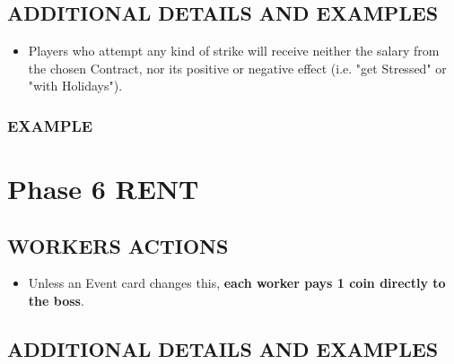     \subsection{ADDITIONAL DETAILS AND EXAMPLES}

        \begin{itemize}
            \item Players who attempt any kind of strike will receive neither the salary from
            the chosen Contract, nor its positive or negative effect (i.e. "get Stressed" or
            "with Holidays").
        \end{itemize}
    
        \subsubsection{EXAMPLE}




\section{Phase 6 RENT}

    \subsection{WORKERS ACTIONS}

        \begin{itemize}
            \item Unless an Event card changes this, \textbf{each worker pays 1 coin directly to the
            boss}.
        \end{itemize}
    
    \subsection{ADDITIONAL DETAILS AND EXAMPLES}

